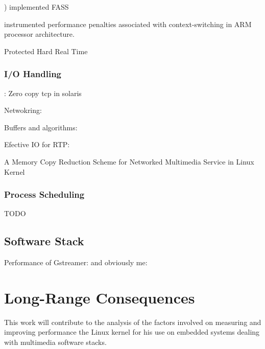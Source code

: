 \citep{Chanteperdrix:2009fk}) implemented FASS

\citep{David:2007:CSO:1281700.1281703}  instrumented performance penalties associated with context-switching in ARM processor architecture.

\cite{Blackham_SH_11} Protected Hard Real Time

\subsubsection{I/O Handling}
\cite{Chu96zero-copytcp}: Zero copy tcp in solaris

Netwokring: \citep{Kim:2002:MCR:646603.697068}

Buffers and algorithms: \cite{Jane98enhancementsto}

Efective IO for RTP: \cite{springerlink:10.1007/s11390-006-0989-5}

\cite{Kim:2002:MCR:646603.697068} A Memory Copy Reduction Scheme for Networked Multimedia Service in Linux Kernel


\subsubsection{Process Scheduling}
TODO

\subsection{Software Stack}
Performance of Gstreamer: \cite{Contreras:vn} and obviously me: \cite{Dompe:2011ys}


\section{Long-Range Consequences}
This work will contribute to the analysis of the factors involved on measuring and improving performance the Linux kernel for his use on embedded systems dealing with multimedia software stacks.
